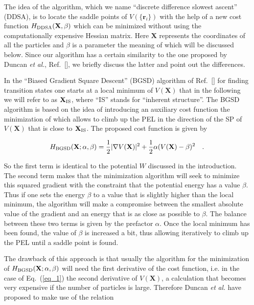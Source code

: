 \documentclass[aip,pre,twocolumn,reprint]{revtex4-1}
\begin{document}
The idea of the algorithm, which we name ``discrete difference slowest
ascent'' (DDSA), is to locate the saddle points of $V(\{\mathbf{r}_i\})$
with the help of a new cost function $H_{\rm DDSA}(\mathbf{X},\beta)$
which can be minimized without using the computationally expensive
Hessian matrix. Here $\mathbf{X}$ represents the coordinates of all
the particles and $\beta$ is a parameter the meaning of which will be
discussed below. Since our algorithm has a certain similarity to the
one proposed by Duncan {\it et al.}, Ref.~[\!\!], 
we briefly discuss the latter and point out the differences.

In the ``Biased Gradient Square Descent'' (BGSD) algorithm of
Ref.~[\!\!] for finding transition states one starts at
a local minimum of $V(\mathbf{X})$ that in the following we will refer to
as $\mathbf{X}_{\rm IS}$, where ``IS'' stands for ``inherent structure''.
The BGSD algorithm is based on the idea of introducing an auxiliary cost
function the minimization of which allows to climb up the PEL in the
direction of the SP of $V(\mathbf{X})$ that is close to $\mathbf{X}_{\rm
IS}$. The proposed cost function is given by


\begin{equation}
H_{\rm BGSD}(\mathbf{X};\alpha,\beta)=\frac{1}{2} \vert \nabla V(\mathbf{X}) \vert ^2 +
\frac{1}{2}\alpha(V(\mathbf{X})-\beta)^2 \quad .
\label{eq_1}
\end{equation}

\noindent
So the first term is identical to the potential $W$ discussed in the
introduction. The second term makes that the minimization algorithm
will seek to minimize this squared gradient with the constraint that the
potential energy has a value $\beta$. Thus if one sets the energy $\beta$
to a value that is slightly higher than the local minimum, the algorithm
will make a compromise between the smallest absolute value of the gradient
and an energy that is as close as possible to $\beta$. The balance between
these two terms is given by the prefactor $\alpha$. Once the local
minimum has been found, the value of $\beta$ is increased a bit, thus
allowing iteratively to climb up the PEL until a saddle point is found.

The drawback of this approach is that usually the algorithm for
the minimization of $H_{\rm BGSD}(\mathbf{X};\alpha,\beta)$ will
need the first derivative of the cost function, i.e. in the case of
Eq.~(\ref{eq_1}) the second derivative of $V(\mathbf{X})$, a calculation
that becomes very expensive if the number of particles is large. Therefore
Duncan {\it et al.} have proposed to make use of the relation
\end{document}
